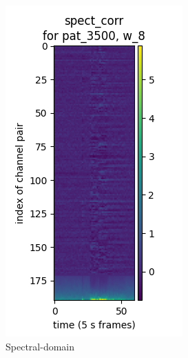 \begin{figure}[htb]
\begin{subfigure}[t]{0.3\textwidth}
        \includegraphics[width=\textwidth]{c2Deterministic/Figs/PSP/spect_corr.png}
        \caption{Spectral-domain}{}
    \end{subfigure}
    \hfill
    \begin{subfigure}[t]{0.3\textwidth}

\end{subfigure}
\end{figure}
